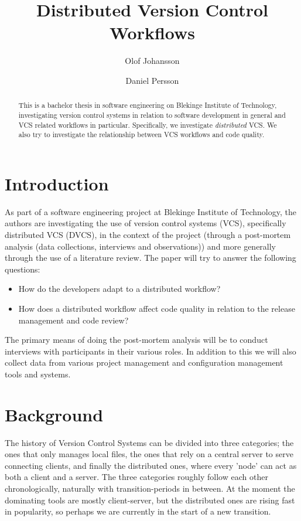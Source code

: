 \documentclass{llncs}
\title{Distributed Version Control Workflows}
\author{Olof Johansson \and Daniel Persson}
\institute{Blekinge Institute of Technology}
\begin{document}
\maketitle

\begin{abstract}
 This is a bachelor thesis in software engineering on Blekinge
 Institute of Technology, investigating version control systems
 in relation to software development in general and VCS related
 workflows in particular. Specifically, we investigate
 \emph{distributed} VCS. We also try to investigate the
 relationship between VCS workflows and code quality.
\end{abstract}

\section{Introduction}

As part of a software engineering project at Blekinge Institute of
Technology, the authors are investigating the use of version control
systems (VCS), specifically distributed VCS (DVCS), in the context of
the project (through a post-mortem analysis (data collections, 
interviews and observations)) and more generally through the use of a
literature review. The paper will try to answer the following questions:

\begin{itemize}
 \item How do the developers adapt to a distributed workflow?
 \item How does a distributed workflow affect code quality in relation
       to the release management and code review?
\end{itemize}

The primary means of doing the post-mortem analysis will be
to conduct interviews with participants in their various roles. In
addition to this we will also collect data from various project
management and configuration management tools and systems.

\section{Background}

The history of Version Control Systems can be divided into three
categories; the ones that only manages local files, the ones that rely
on a central server to serve connecting clients, and finally the
distributed ones, where every 'node' can act as both a client and a
server. The three categories roughly follow each other
chronologically, naturally with transition-periods in between. At the
moment the dominating tools are mostly client-server, but the
distributed ones are rising fast in popularity, so perhaps we are
currently in the start of a new transition.
\end{document}
